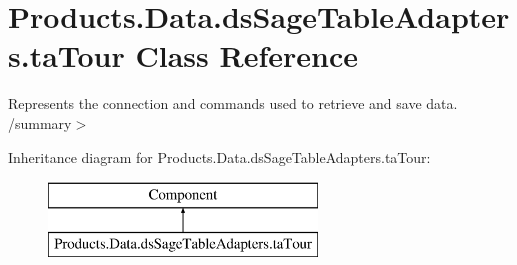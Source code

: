 \hypertarget{class_products_1_1_data_1_1ds_sage_table_adapters_1_1ta_tour}{}\section{Products.\+Data.\+ds\+Sage\+Table\+Adapters.\+ta\+Tour Class Reference}
\label{class_products_1_1_data_1_1ds_sage_table_adapters_1_1ta_tour}


Represents the connection and commands used to retrieve and save data. /summary$>$  


Inheritance diagram for Products.\+Data.\+ds\+Sage\+Table\+Adapters.\+ta\+Tour\+:\begin{figure}[H]
\begin{center}
\leavevmode
\includegraphics[height=2.000000cm]{class_products_1_1_data_1_1ds_sage_table_adapters_1_1ta_tour}
\end{center}
\end{figure}
